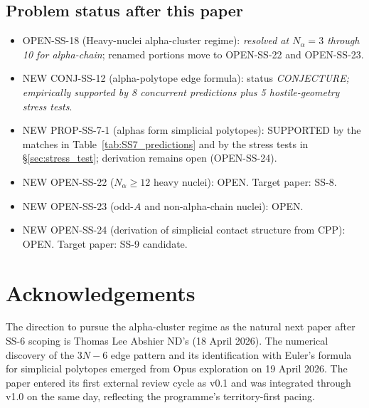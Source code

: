 \documentclass[11pt,letterpaper]{article}
\newcommand{\Nalpha}{N_{\alpha}}
\begin{document}
\subsection{Problem status after this paper}

\begin{itemize}
\item OPEN-SS-18 (Heavy-nuclei alpha-cluster regime): \emph{resolved at $\Nalpha = 3$ through 10 for alpha-chain}; renamed portions move to OPEN-SS-22 and OPEN-SS-23.
\item NEW CONJ-SS-12 (alpha-polytope edge formula): status \emph{CONJECTURE; empirically supported by 8 concurrent predictions plus 5 hostile-geometry stress tests}.
\item NEW PROP-SS-7-1 (alphas form simplicial polytopes): SUPPORTED by the matches in Table~\ref{tab:SS7_predictions} and by the stress tests in \S\ref{sec:stress_test}; derivation remains open (OPEN-SS-24).
\item NEW OPEN-SS-22 ($\Nalpha \geq 12$ heavy nuclei): OPEN. Target paper: SS-8.
\item NEW OPEN-SS-23 (odd-$A$ and non-alpha-chain nuclei): OPEN.
\item NEW OPEN-SS-24 (derivation of simplicial contact structure from CPP): OPEN. Target paper: SS-9 candidate.
\end{itemize}

\section*{Acknowledgements}

The direction to pursue the alpha-cluster regime as the natural next paper after SS-6 scoping is Thomas Lee Abshier ND's (18 April 2026). The numerical discovery of the $3N - 6$ edge pattern and its identification with Euler's formula for simplicial polytopes emerged from Opus exploration on 19 April 2026. The paper entered its first external review cycle as v0.1 and was integrated through v1.0 on the same day, reflecting the programme's territory-first pacing.
\end{document}
